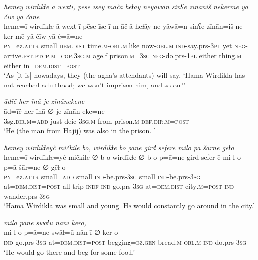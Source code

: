 \ea \label{BP.123}
\textit{ħemey wirdīkɫe ā wextī, pēse īsey māčā heɫāy neyāwān sinʕe zīnāniš nekermē yā čīw yā čāne} \\ 
\gll ħeme=ī wirdīkɫe ā wext-ī pēse īse-ī m-āč-ā heɫāy ne-yāwā=n sinʕe zīnān=iš ne-ker-mē yā čīw yā č=ā=ne \\ 
 \textsc{pn}=ez.\textsc{attr} small \textsc{dem.dist} time\textsc{.m}\textsc{-obl}\textsc{.m} like now\textsc{-obl}\textsc{.m} \textsc{ind-}say.prs\textsc{-3pl} yet \textsc{neg-}arrive\textsc{.pst}\textsc{.ptcp}\textsc{.m}\textsc{=cop}\textsc{.3sg}\textsc{.m} age.f prison\textsc{.m}\textsc{=3sg} \textsc{neg-}do.prs\textsc{-\textsc{1pl}} either thing\textsc{.m} either in=\textsc{dem.dist}\textsc{=\textsc{post}} \\ 
\glt `As [it is] nowadays, they (the agha’s attendants) will say, ‘Hama Wirdikla has not reached adulthood; we won’t imprison him, and so on.’'
\z 
 
\ea \label{BP.140}
\textit{āđīč her īnā je zīnānekene} \\ 
\gll āđ=īč her īnā-∅ je zīnān-eke=ne \\ 
 3sg\textsc{.dir}\textsc{.m}\textsc{=add} just deic\textsc{-3sg}\textsc{.m} from prison\textsc{.m}\textsc{-def}\textsc{.dir}\textsc{.m}\textsc{=\textsc{post}} \\ 
\glt `He (the man from Hajij) was also in the prison. '
\z 
 
\ea \label{BP.143}
\textit{ħemey wirdīkɫeyč mičkile bo, wirdīkɫe bo pāne girđ seferē milo pā šārne gēɫo} \\ 
\gll ħeme=ī wirdīkɫe=yč mičkile ∅-b-o wirdīkɫe ∅-b-o p=ā=ne girđ sefer-ē mi-l-o p=ā šār=ne ∅-gēɫ-o \\ 
 \textsc{pn}=ez.\textsc{attr} small\textsc{=add} small \textsc{ind-}be.prs\textsc{-3sg} small \textsc{ind-}be.prs\textsc{-3sg} at=\textsc{dem.dist}\textsc{=\textsc{post}} all trip\textsc{-indf} \textsc{ind-}go.prs\textsc{-3sg} at=\textsc{dem.dist} city\textsc{.m}\textsc{=\textsc{post}} \textsc{ind-}wander.prs\textsc{-3sg} \\ 
\glt `Hama Wirdikla was small and young. He would constantly go around in the city.'
\z 
 
\ea \label{BP.144}
\textit{milo pāne swāɫū nānī kero,} \\ 
\gll mi-l-o p=ā=ne swāɫ=ū nān-ī ∅-ker-o \\ 
 \textsc{ind-}go.prs\textsc{-3sg} at=\textsc{dem.dist}\textsc{=\textsc{post}} begging\textsc{=ez.gen} bread\textsc{.m}\textsc{-obl}\textsc{.m} \textsc{ind-}do.prs\textsc{-3sg} \\ 
\glt `He would go there and beg for some food.'
\z 
 

